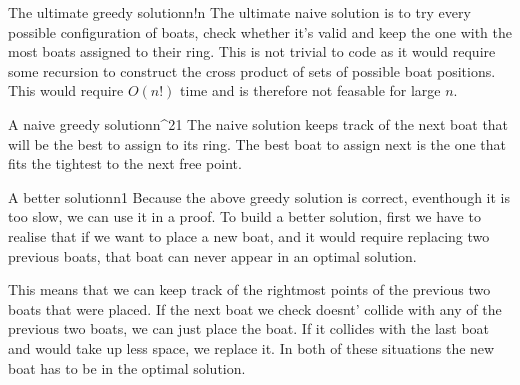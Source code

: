 \documentclass{writeup}
\begin{document}

\begin{solutions}
  \begin{solution}{The ultimate greedy solution}{n!}{n}
    The ultimate naive solution is to try every possible configuration of boats, check whether it's valid and keep the one with the most boats assigned to their ring.
    This is not trivial to code as it would require some recursion to construct the cross product of sets of possible boat positions.
    This would require $O(n!)$ time and is therefore not feasable for large $n$.
  \end{solution}
  
  \begin{solution}{A naive greedy solution}{n^2}{1}
    The naive solution keeps track of the next boat that will be the best to assign to its ring.
    The best boat to assign next is the one that fits the tightest to the next free point.

  \end{solution}

  \begin{solution}{A better solution}{n}{1}
    Because the above greedy solution is correct, eventhough it is too slow, we can use it in a proof.
    To build a better solution, first we have to realise that if we want to place a new boat, and it would require replacing two previous boats, that boat can never appear in an optimal solution.

    This means that we can keep track of the rightmost points of the previous two boats that were placed.
    If the next boat we check doesnt' collide with any of the previous two boats, we can just place the boat.
    If it collides with the last boat and would take up less space, we replace it.
    In both of these situations the new boat has to be in the optimal solution.
  \end{solution}
\end{solutions}
\end{document}
